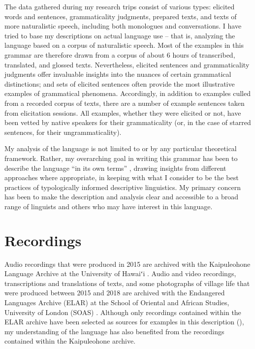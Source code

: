 The data gathered during my research trips consist of various types: elicited words and sentences, grammaticality judgments, prepared texts, and texts of more naturalistic speech, including both monologues and conversations. I have tried to base my descriptions on actual language use -- that is, analyzing the language based on a corpus of naturalistic speech. Most of the examples in this grammar are therefore drawn from a corpus of about 6 hours of transcribed, translated, and glossed texts. Nevertheless, elicited sentences and grammaticality judgments offer invaluable insights into the nuances of certain grammatical distinctions; and sets of elicited sentences often provide the most illustrative examples of grammatical phenomena. Accordingly, in addition to examples culled from a recorded corpus of texts, there are a number of example sentences taken from elicitation sessions. All examples, whether they were elicited or not, have been vetted by native speakers for their grammaticality (or, in the case of starred sentences, for their ungrammaticality).

  My analysis of the language is not limited to or by any particular theoretical framework. Rather, my overarching goal in writing this grammar has been to describe the language “in its own terms” \citep[211]{Dryer2006}, drawing insights from different approaches where appropriate, in keeping with what I consider to be the best practices of typologically informed descriptive linguistics. My primary concern has been to make the description and analysis clear and accessible to a broad range of linguists and others who may have interest in this language.

\section{Recordings}\label{sec:app.e}

Audio recordings that were produced in 2015 are archived with the \mbox{Kaipuleohone} Language Archive at the University of Hawaiʻi \citep{Barlow2015}. Audio and video recordings, transcriptions and translations of texts, and some photographs of village life that were produced between 2015 and 2018 are archived with the Endangered Languages Archive (ELAR) at the School of Oriental and African Studies, University of London (SOAS) \citep{Barlow2018b}. Although only recordings contained within the ELAR archive have been selected as sources for examples in this description (), my understanding of the language has also benefited from the recordings contained within the Kaipuleohone archive.

